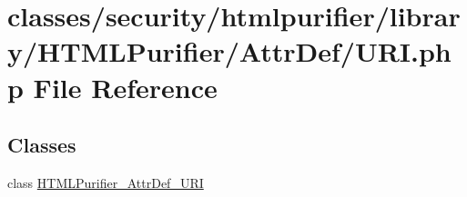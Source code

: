 \hypertarget{AttrDef_2URI_8php}{\section{classes/security/htmlpurifier/library/\+H\+T\+M\+L\+Purifier/\+Attr\+Def/\+U\+R\+I.php File Reference}
\label{AttrDef_2URI_8php}
}
\subsection*{Classes}
\begin{DoxyCompactItemize}
\item 
class \hyperlink{classHTMLPurifier__AttrDef__URI}{H\+T\+M\+L\+Purifier\+\_\+\+Attr\+Def\+\_\+\+U\+R\+I}
\end{DoxyCompactItemize}
